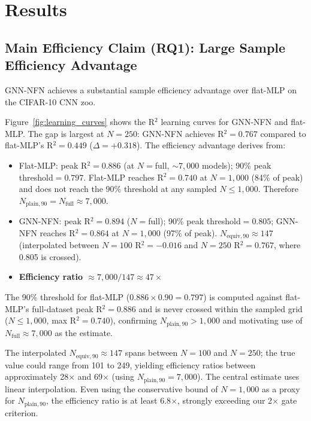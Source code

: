 \section{Results}
\label{sec:results}

\subsection{Main Efficiency Claim (RQ1): Large Sample Efficiency Advantage}

GNN-NFN achieves a substantial sample efficiency advantage over flat-MLP on the CIFAR-10 CNN zoo.

Figure~\ref{fig:learning_curves} shows the R$^2$ learning curves for GNN-NFN and flat-MLP. The gap is largest at $N{=}250$: GNN-NFN achieves R$^2{=}0.767$ compared to flat-MLP's R$^2{=}0.449$ ($\Delta{=}{+}0.318$). The efficiency advantage derives from:

\begin{itemize}
    \item Flat-MLP: peak R$^2{=}0.886$ (at $N{=}$full, ${\sim}7{,}000$ models); 90\% peak threshold$=0.797$. Flat-MLP reaches R$^2{=}0.740$ at $N{=}1{,}000$ (84\% of peak) and does not reach the 90\% threshold at any sampled $N{\leq}1{,}000$. Therefore $N_{\text{plain},90} = N_{\text{full}} \approx 7{,}000$.
    \item GNN-NFN: peak R$^2{=}0.894$ ($N{=}$full); 90\% peak threshold$=0.805$; GNN-NFN reaches R$^2{=}0.864$ at $N{=}1{,}000$ (97\% of peak). $N_{\text{equiv},90}{\approx}147$ (interpolated between $N{=}100$ R$^2{=}{-}0.016$ and $N{=}250$ R$^2{=}0.767$, where 0.805 is crossed).
    \item \textbf{Efficiency ratio $\approx 7{,}000 / 147 \approx 47{\times}$}
\end{itemize}

The 90\% threshold for flat-MLP ($0.886 \times 0.90 = 0.797$) is computed against flat-MLP's full-dataset peak R$^2{=}0.886$ and is never crossed within the sampled grid ($N \leq 1{,}000$, max R$^2{=}0.740$), confirming $N_{\text{plain},90} > 1{,}000$ and motivating use of $N_{\text{full}}{\approx}7{,}000$ as the estimate.

The interpolated $N_{\text{equiv},90}{\approx}147$ spans between $N{=}100$ and $N{=}250$; the true value could range from 101 to 249, yielding efficiency ratios between approximately 28$\times$ and 69$\times$ (using $N_{\text{plain},90} = 7{,}000$). The central estimate uses linear interpolation. Even using the conservative bound of $N{=}1{,}000$ as a proxy for $N_{\text{plain},90}$, the efficiency ratio is at least 6.8$\times$, strongly exceeding our 2$\times$ gate criterion.

